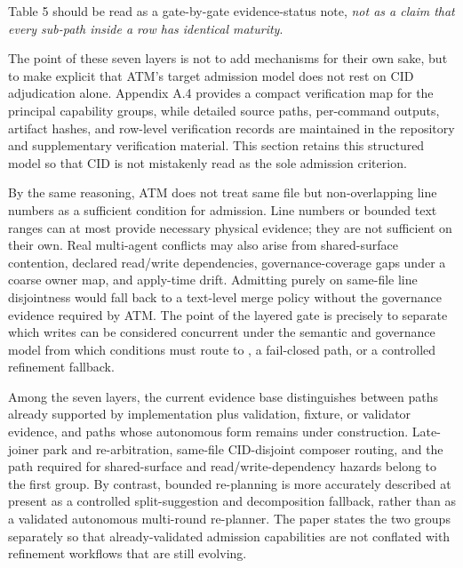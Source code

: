 \documentclass[9pt,letterpaper]{extarticle}
\begin{document}
Table 5 should be read as a gate-by-gate evidence-status note, \emph{not as a claim that every sub-path inside a row has identical maturity}.

The point of these seven layers is not to add mechanisms for their own sake, but to make explicit that ATM's target admission model does not rest on CID adjudication alone. Appendix A.4 provides a compact verification map for the principal capability groups, while detailed source paths, per-command outputs, artifact hashes, and row-level verification records are maintained in the repository and supplementary verification material. This section retains this structured model so that CID is not mistakenly read as the sole admission criterion.

By the same reasoning, ATM does not treat {}same file but non-overlapping line numbers{} as a sufficient condition for admission. Line numbers or bounded text ranges can at most provide necessary physical evidence; they are not sufficient on their own. Real multi-agent conflicts may also arise from shared-surface contention, declared read/write dependencies, governance-coverage gaps under a coarse owner map, and apply-time drift. Admitting purely on same-file line disjointness would fall back to a text-level merge policy without the governance evidence required by ATM. The point of the layered gate is precisely to separate which writes can be considered concurrent under the semantic and governance model from which conditions must route to \texttt{}, a fail-closed path, or a controlled refinement fallback.

Among the seven layers, the current evidence base distinguishes between paths already supported by implementation plus validation, fixture, or validator evidence, and paths whose autonomous form remains under construction. Late-joiner park and re-arbitration, same-file CID-disjoint composer routing, and the \texttt{} path required for shared-surface and read/write-dependency hazards belong to the first group. By contrast, bounded re-planning is more accurately described at present as a controlled split-suggestion and decomposition fallback, rather than as a validated autonomous multi-round re-planner. The paper states the two groups separately so that already-validated admission capabilities are not conflated with refinement workflows that are still evolving.
\end{document}
